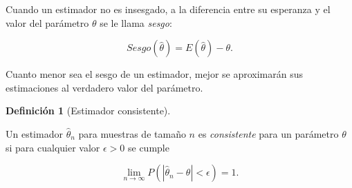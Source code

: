 \documentclass[
  a4paper,
]{scrreport}
\theoremstyle{plain}
\theoremstyle{definition}
\theoremstyle{definition}
\newtheorem{definition}{Definición}[chapter]
\theoremstyle{remark}
\begin{document}
Cuando un estimador no es insesgado, a la diferencia entre su esperanza
y el valor del parámetro \(\theta\) se le llama \emph{sesgo}:

\[
Sesgo(\hat \theta) = E(\hat \theta)-\theta.
\]

Cuanto menor sea el sesgo de un estimador, mejor se aproximarán sus
estimaciones al verdadero valor del parámetro.

\begin{definition}[Estimador
consistente]\protect\hypertarget{def-estimador-consistente}{}\label{def-estimador-consistente}

Un estimador \(\hat \theta_n\) para muestras de tamaño \(n\) es
\emph{consistente} para un parámetro \(\theta\) si para cualquier valor
\(\epsilon>0\) se cumple

\[
\lim_{n\rightarrow \infty} P(|\hat \theta_n-\theta|<\epsilon)=1.
\]

\end{definition}
\end{document}
